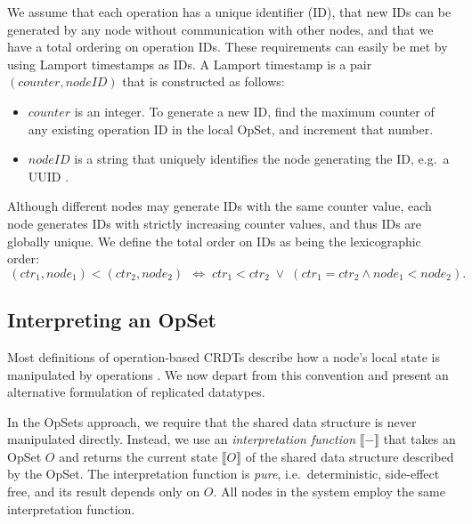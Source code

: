 We assume that each operation has a unique identifier (ID), that new IDs can be generated by any node without communication with other nodes, and that we have a total ordering on operation IDs.
These requirements can easily be met by using Lamport timestamps \cite{Lamport:1978jq} as IDs.
A Lamport timestamp is a pair $(\mathit{counter}, \mathit{nodeID})$ that is constructed as follows:
\begin{itemize}
\item $\mathit{counter}$ is an integer.
    To generate a new ID, find the maximum counter of any existing operation ID in the local OpSet, and increment that number.
\item $\mathit{nodeID}$ is a string that uniquely identifies the node generating the ID, e.g.\ a UUID \cite{Leach:2005hm}.
\end{itemize}

Although different nodes may generate IDs with the same counter value, each node generates IDs with strictly increasing counter values, and thus IDs are globally unique.
We define the total order on IDs as being the lexicographic order:
\[
    \,(\mathit{ctr}_1, \mathit{node}_1) < (\mathit{ctr}_2, \mathit{node}_2)\,
    \;\Longleftrightarrow\;
    \mathit{ctr}_1 < \mathit{ctr}_2 \;\vee\;
    (\mathit{ctr}_1 = \mathit{ctr}_2 \wedge \mathit{node}_1 <\mathit{node}_2).
\]


\subsection{Interpreting an OpSet}\label{sec:op-serial}

Most definitions of operation-based CRDTs describe how a node's local state is manipulated by operations \cite{Shapiro:2011wy,Shapiro:2011un}.
We now depart from this convention and present an alternative formulation of replicated datatypes.

In the OpSets approach, we require that the shared data structure is never manipulated directly.
Instead, we use an \emph{interpretation function} $\llbracket-\rrbracket$ that takes an OpSet $O$ and returns the current state $\llbracket O \rrbracket$ of the shared data structure described by the OpSet.
The interpretation function is \emph{pure}, i.e.\ deterministic, side-effect free, and its result depends only on $O$.
All nodes in the system employ the same interpretation function.

